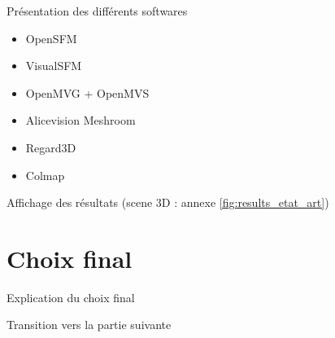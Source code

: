 Présentation des différents softwares
\begin{itemize}
    \item OpenSFM
    \item VisualSFM
    \item OpenMVG + OpenMVS
    \item Alicevision Meshroom
    \item Regard3D
    \item Colmap
\end{itemize}

Affichage des résultats (scene 3D : annexe \ref{fig:results_etat_art})


\section{Choix final}

Explication du choix final

Transition vers la partie suivante